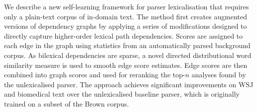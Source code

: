 We describe a new self-learning framework for parser lexicalisation that requires only a plain-text corpus of in-domain text. The method first creates
 augmented versions of dependency graphs by applying a series of modifications
 designed to directly capture higher-order lexical path dependencies. Scores are
 assigned to each edge in the graph using statistics from an automatically
 parsed background corpus. As bilexical dependencies are sparse, a novel
 directed distributional word similarity measure is used to smooth edge score
 estimates. Edge scores are then combined into graph scores and used for
 reranking the top-$n$ analyses found by the unlexicalised parser. The approach
 achieves significant improvements on WSJ and biomedical text over the
 unlexicalised baseline parser, which is originally trained on a subset of the
 Brown corpus.

